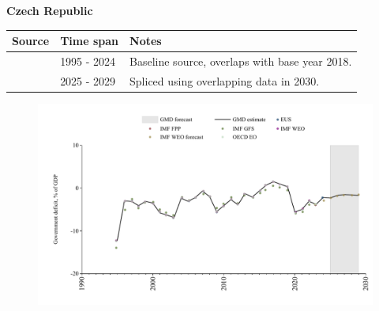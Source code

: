 \documentclass[12pt,a4paper,landscape]{article}
\begin{document}
\begin{adjustbox}{max totalsize={\paperwidth}{\paperheight},center}
\begin{minipage}[t][\textheight][t]{\textwidth}
\vspace*{0.5cm}
{}
\begin{center}
{\Large\bfseries Czech Republic}
\end{center}
\vspace{0.5cm}
\begin{table}[H]
\centering
\small
\begin{tabular}{|l|l|l|}
\hline
\textbf{Source} & \textbf{Time span} & \textbf{Notes} \\
\hline
\rowcolor{white}\cite{EUS}& 1995 - 2024 &Baseline source, overlaps with base year 2018.\\
\rowcolor{lightgray}\cite{IMF_WEO_forecast}& 2025 - 2029 &Spliced using overlapping data in 2030.\\
\hline
\end{tabular}
\end{table}
\begin{figure}[H]
\centering
\includegraphics[width=\textwidth,height=0.6\textheight,keepaspectratio]{graphs/CZE_govdef_GDP.pdf}
\end{figure}
\end{minipage}
\end{adjustbox}
\end{document}
